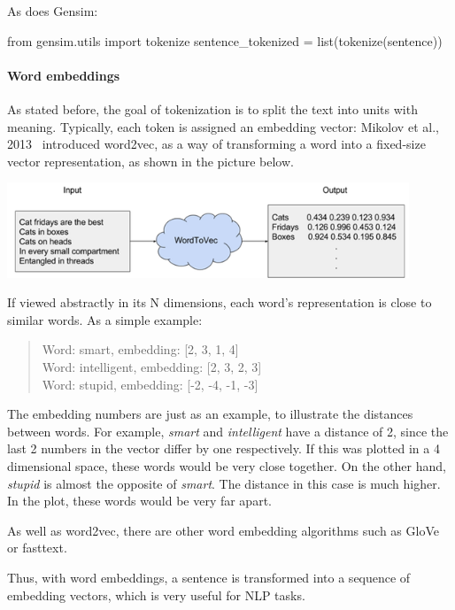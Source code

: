 As does Gensim:

\begin{python}
from gensim.utils import tokenize
sentence_tokenized = list(tokenize(sentence))
\end{python}

\paragraph{Word embeddings}\label{subsec:wordemb}

As stated before, the goal of tokenization is to split the text into units with meaning. Typically, each token is assigned an embedding vector: Mikolov et al., 2013~\cite{mikolov2013efficient} introduced word2vec, as a way of transforming a word into a fixed-size vector representation, as shown in the picture below.

\begin{center}
\includegraphics[width=12cm]{figures/word_emb.png}
\end{center}

If viewed abstractly in its N dimensions, each word's representation is close to similar words. As a simple example:

\begin{quote}
    Word: smart, embedding: [2, 3, 1, 4]\\
    Word: intelligent, embedding: [2, 3, 2, 3]\\
    Word: stupid, embedding: [-2, -4, -1, -3]
\end{quote}

The embedding numbers are just as an example, to illustrate the distances between words. For example, \emph{smart} and \emph{intelligent} have a distance of 2, since the last 2 numbers in the vector differ by one respectively. If this was plotted in a 4 dimensional space, these words would be very close together. On the other hand, \emph{stupid} is almost the opposite of \emph{smart}. The distance in this case is much higher. In the plot, these words would be very far apart.

As well as word2vec, there are other word embedding algorithms such as GloVe or fasttext.

Thus, with word embeddings, a sentence is transformed into a sequence of embedding vectors, which is very useful for NLP tasks.

